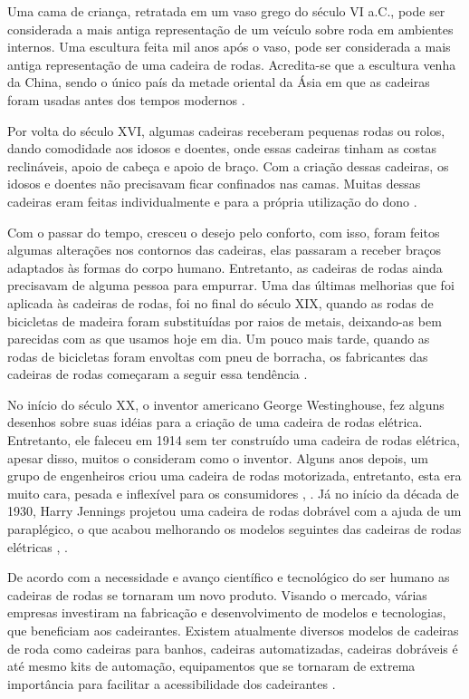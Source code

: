 Uma cama de criança, retratada em um vaso grego do século VI a.C., pode ser considerada a mais antiga representação de um veículo sobre roda em ambientes internos. Uma escultura feita mil anos após o vaso, pode ser considerada a mais antiga representação de uma cadeira de rodas. Acredita-se que a escultura venha da China, sendo o único país da metade oriental da Ásia em que as cadeiras foram usadas antes dos tempos modernos \cite{souza}.

Por volta do século XVI, algumas cadeiras receberam pequenas rodas ou rolos, dando comodidade aos idosos e doentes, onde essas cadeiras tinham as costas reclináveis, apoio de cabeça e apoio de braço. Com a criação dessas cadeiras, os idosos e doentes não precisavam ficar confinados nas camas. Muitas dessas cadeiras eram feitas individualmente e para a própria utilização do dono \cite{souza}.

Com o passar do tempo, cresceu o desejo pelo conforto, com isso, foram feitos algumas alterações nos contornos das cadeiras, elas passaram a receber braços adaptados às formas do corpo humano. Entretanto, as cadeiras de rodas ainda precisavam de alguma pessoa para empurrar. Uma das últimas melhorias que foi aplicada às cadeiras de rodas, foi no final do século XIX, quando as rodas de bicicletas de madeira foram substituídas por raios de metais, deixando-as bem parecidas com as que usamos hoje em dia. Um pouco mais tarde, quando as rodas de bicicletas foram envoltas com pneu de borracha, os fabricantes das cadeiras de rodas começaram a seguir essa tendência \cite{souza}.

No início do século XX, o inventor americano George Westinghouse, fez alguns desenhos sobre suas idéias para a criação de uma cadeira de rodas elétrica. Entretanto, ele faleceu em 1914 sem ter construído uma cadeira de rodas elétrica, apesar disso, muitos o consideram como o inventor. Alguns anos depois, um grupo de engenheiros criou uma cadeira de rodas motorizada, entretanto, esta era muito cara, pesada e inflexível para os consumidores \cite{clark}, \cite{shepard}. Já no início da década de 1930, Harry Jennings projetou uma cadeira de rodas dobrável com a ajuda de um paraplégico, o que acabou melhorando os modelos seguintes das cadeiras de rodas elétricas \cite{clark}, \cite{shepard}.

De acordo com a necessidade e avanço científico e tecnológico do ser humano as cadeiras de rodas se tornaram um novo produto. Visando o mercado, várias empresas investiram na fabricação e desenvolvimento de modelos e tecnologias, que beneficiam aos cadeirantes. Existem atualmente diversos modelos de cadeiras de roda como cadeiras para banhos, cadeiras automatizadas, cadeiras dobráveis é até mesmo kits de automação, equipamentos que se tornaram de extrema importância para facilitar a acessibilidade dos cadeirantes \cite{ione}.

